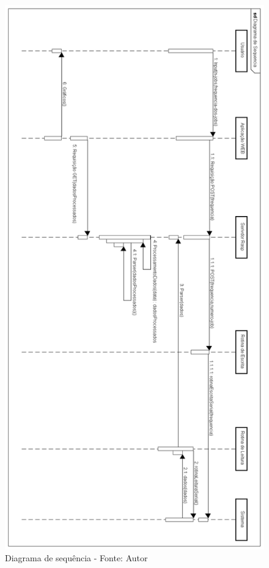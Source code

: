 \begin{figure}[H]
\label{fig:diagrama_sequencia_pc2}
\centering
\includegraphics[keepaspectratio=true,scale=0.5]{figuras/diagrama_sequencia_pc2.png}
\caption{Diagrama de sequência - Fonte: Autor}
\end{figure}
